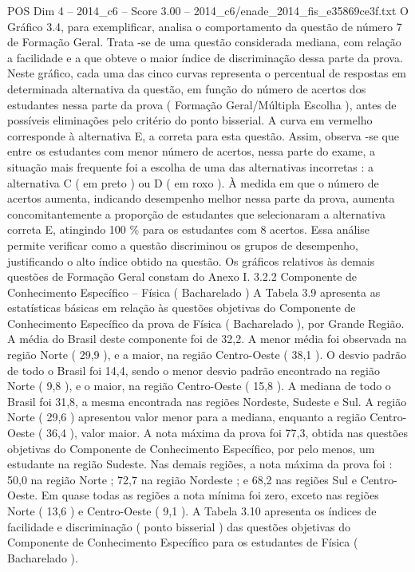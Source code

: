 \begin{textsample}{POS Dim 4 – 2014\_c6 – Score 3.00 – 2014\_c6/enade\_2014\_fis\_e35869ce3f.txt}
O Gráfico 3.4, para exemplificar, analisa o comportamento da questão de número 7 de Formação Geral.
Trata -se de uma questão considerada mediana, com relação a facilidade e a que obteve o maior índice de discriminação dessa parte da prova.
Neste gráfico, cada uma das cinco curvas representa o percentual de respostas em determinada alternativa da questão, em função do número de acertos dos estudantes nessa parte da prova ( Formação Geral/Múltipla Escolha ), antes de possíveis eliminações pelo critério do ponto bisserial.
A curva em vermelho corresponde à alternativa E, a correta para esta questão.
Assim, observa -se que entre os estudantes com menor número de acertos, nessa parte do exame, a situação mais frequente foi a escolha de uma das alternativas incorretas : a alternativa C ( em preto ) ou D ( em roxo ).
À medida em que o número de acertos aumenta, indicando desempenho melhor nessa parte da prova, aumenta concomitantemente a proporção de estudantes que selecionaram a alternativa correta E, atingindo 100 \% para os estudantes com 8 acertos.
Essa análise permite verificar como a questão discriminou os grupos de desempenho, justificando o alto índice obtido na questão.
Os gráficos relativos às demais questões de Formação Geral constam do Anexo I. 3.2.2 Componente de Conhecimento Específico – Física ( Bacharelado ) A Tabela 3.9 apresenta as estatísticas básicas em relação às questões objetivas do Componente de Conhecimento Específico da prova de Física ( Bacharelado ), por Grande Região.
A média do Brasil deste componente foi de 32,2.
A menor média foi observada na região Norte ( 29,9 ), e a maior, na região Centro-Oeste ( 38,1 ).
O desvio padrão de todo o Brasil foi 14,4, sendo o menor desvio padrão encontrado na região Norte ( 9,8 ), e o maior, na região Centro-Oeste ( 15,8 ).
A mediana de todo o Brasil foi 31,8, a mesma encontrada nas regiões Nordeste, Sudeste e Sul.
A região Norte ( 29,6 ) apresentou valor menor para a mediana, enquanto a região Centro-Oeste ( 36,4 ), valor maior.
A nota máxima da prova foi 77,3, obtida nas questões objetivas do Componente de Conhecimento Específico, por pelo menos, um estudante na região Sudeste.
Nas demais regiões, a nota máxima da prova foi : 50,0 na região Norte ; 72,7 na região Nordeste ; e 68,2 nas regiões Sul e Centro-Oeste.
Em quase todas as regiões a nota mínima foi zero, exceto nas regiões Norte ( 13,6 ) e Centro-Oeste ( 9,1 ).
A Tabela 3.10 apresenta os índices de facilidade e discriminação ( ponto bisserial ) das questões objetivas do Componente de Conhecimento Específico para os estudantes de Física ( Bacharelado ).

\end{textsample}
